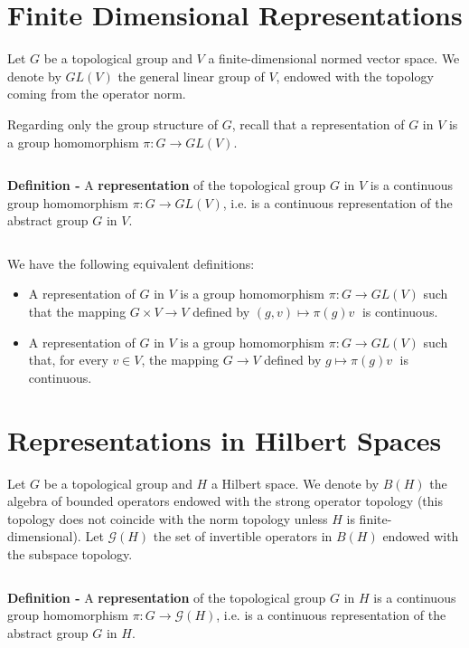 \documentclass[12pt]{article}
\begin{document}
\section{Finite Dimensional Representations}

Let $G$ be a topological group and $V$ a finite-dimensional normed vector space. We denote by $GL(V)$ the general linear group of $V$, endowed with the topology coming from the operator norm.

Regarding only the group structure of $G$, recall that a representation of $G$ in $V$ is a group homomorphism $\pi:G \longrightarrow GL(V)$.

$\,$

{\bf Definition -} A {\bf representation} of the topological group $G$ in $V$ is a continuous group homomorphism $\pi:G \longrightarrow GL(V)$, i.e. is a continuous representation of the abstract group $G$ in $V$.

$\,$

We have the following equivalent definitions:

\begin{itemize}
\item A representation of $G$ in $V$ is a group homomorphism $\pi:G \longrightarrow GL(V)$ such that the mapping $G \times V \longrightarrow V$ defined by
$(g,v) \mapsto \pi(g)v\;$
is continuous.
\end{itemize}
\begin{itemize}
\item A representation of $G$ in $V$ is a group homomorphism $\pi:G \longrightarrow GL(V)$ such that, for every $v \in V$, the mapping $G \longrightarrow V$ defined by
$g \mapsto \pi(g)v\;$
is continuous.
\end{itemize}

\section{Representations in Hilbert Spaces}
Let $G$ be a topological group and $H$ a Hilbert space. We denote by $B(H)$ the algebra of bounded operators endowed with the strong operator topology (this topology does not coincide with the norm topology unless $H$ is finite-dimensional).  Let $\mathcal{G}(H)$ the set of invertible operators in $B(H)$ endowed with the subspace topology.

$\,$

{\bf Definition -} A {\bf representation} of the topological group $G$ in $H$ is a continuous group homomorphism $\pi:G \longrightarrow \mathcal{G}(H)$, i.e. is a continuous representation of the abstract group $G$ in $H$.
\end{document}
